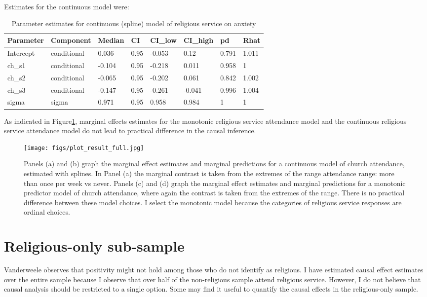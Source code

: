 \documentclass[]{interact}
\theoremstyle{plain}%
\theoremstyle{definition}
\theoremstyle{remark}
\begin{document}
Estimates for the continuous model were:

\begin{table}[h!bt]

\caption{Parameter estimates for continuous (spline) model of religious service on anxiety}
\centering
\begin{tabular}[t]{llllllll}
\toprule
Parameter & Component & Median & CI & CI\_low & CI\_high & pd & Rhat\\
\midrule
Intercept & conditional & 0.036 & 0.95 & -0.053 & 0.12 & 0.791 & 1.011\\
ch\_s1 & conditional & -0.104 & 0.95 & -0.218 & 0.011 & 0.958 & 1\\
ch\_s2 & conditional & -0.065 & 0.95 & -0.202 & 0.061 & 0.842 & 1.002\\
ch\_s3 & conditional & -0.147 & 0.95 & -0.261 & -0.041 & 0.996 & 1.004\\
sigma & sigma & 0.971 & 0.95 & 0.958 & 0.984 & 1 & 1\\
\bottomrule
\end{tabular}
\label{tab:bayescontinuous}
\end{table}

As indicated in Figure\ref{fig:Figure4}, marginal effects estimates for the monotonic religious service attendance model and the continuous religious service attendance model do not lead to practical difference in the causal inference.   

\begin{figure}
\centering
    \caption{Panels (a) and (b) graph the marginal effect estimates and marginal predictions for a continuous model of church attendance, estimated with splines. In Panel (a) the marginal contrast is taken from the extremes of the range attendance range: more than once per week vs never. Panels (c) and (d) graph the marginal effect estimates and marginal predictions for a monotonic predictor model of church attendance, where again the contrast is taken from the extremes of the range. There is no practical difference between these model choices. I select the monotonic model because the categories of religious service responses are ordinal choices.}
    \texttt{[image: figs/plot\_result\_full.jpg]}
    \label{fig:Figure4}
\end{figure}

\newpage
\section{Religious-only sub-sample}
\label{app:relonly}
Vanderweele observes that positivity might not hold among those who do not identify as religious. I have estimated causal effect estimates over the entire sample because I observe that over half of the non-religious sample attend religious service. However, I do not believe that causal analysis should be restricted to a single option. Some may find it useful to quantify the causal effects in the religious-only sample.
\end{document}

